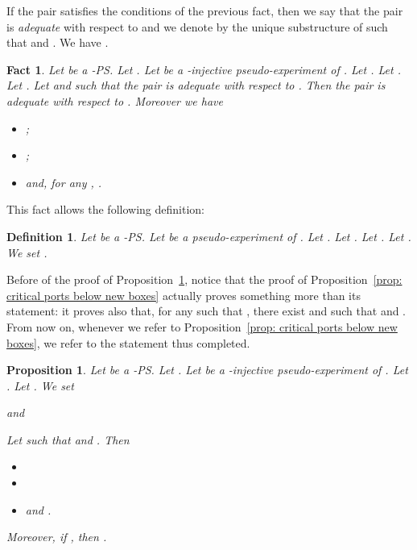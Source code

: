 \documentclass{article}
\theoremstyle{plain}
\newtheorem{definition}{Definition}
\newtheorem{prop}[theorem]{Proposition}
\newtheorem{fact}[theorem]{Fact}
\begin{document}
If the pair  satisfies the conditions of the previous fact, then we say that the pair  is \emph{adequate} with respect to  and we denote by  the unique substructure  of  such that  and . We have .


\begin{fact}\label{fact: from taylor{e1}{i} to taylor{e}{i}}
Let  be a -PS. Let . Let  be a -injective pseudo-experiment of . Let . 
Let . Let . 
Let  and  such that the pair  is adequate with respect to . Then the pair  is adequate with respect to . Moreover we have 
\begin{itemize}
\item ;
\item ;
\item and, for any , .
\end{itemize}
\end{fact}

This fact allows the following definition:

\begin{definition}\label{defin: T[R, e, i]}
Let  be a -PS. Let  be a pseudo-experiment of . Let . 
Let . Let . 
Let . We set .
\end{definition}

Before of the proof of Proposition~\ref{prop: crucial}, notice that the proof of Proposition~\ref{prop: critical ports below new boxes} actually proves something more than its statement: it proves also that, for any  such that , there exist  and  such that  and . From now on, whenever we refer to Proposition~\ref{prop: critical ports below new boxes}, we refer to the statement thus completed.

\begin{prop}\label{prop: crucial}
Let  be a -PS. Let . 
Let  be a -injective pseudo-experiment of . Let . 
Let . We set 

and

Let  such that  
and . Then 
\begin{itemize}
\item 
\item 
\item and .
\end{itemize}
Moreover, if , then .
\end{prop}
\end{document}
